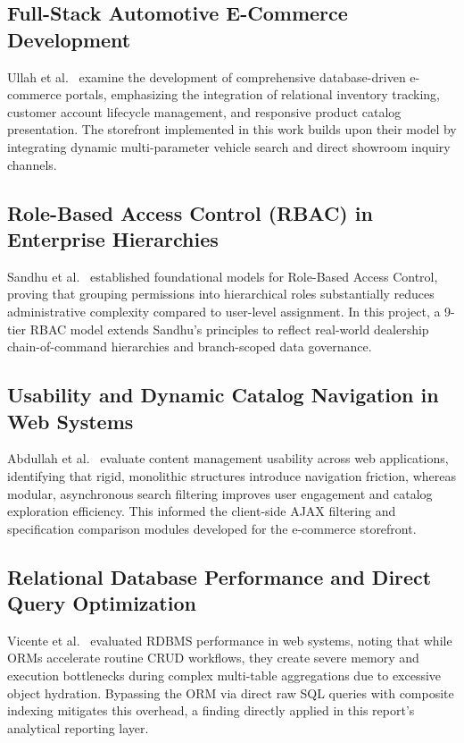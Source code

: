 \subsection{Full-Stack Automotive E-Commerce Development}
Ullah et al.~\cite{ullah2016developing} examine the development of comprehensive database-driven e-commerce portals, emphasizing the integration of relational inventory tracking, customer account lifecycle management, and responsive product catalog presentation. The storefront implemented in this work builds upon their model by integrating dynamic multi-parameter vehicle search and direct showroom inquiry channels.

\subsection{Role-Based Access Control (RBAC) in Enterprise Hierarchies}
Sandhu et al.~\cite{sandhu1996role} established foundational models for Role-Based Access Control, proving that grouping permissions into hierarchical roles substantially reduces administrative complexity compared to user-level assignment. In this project, a 9-tier RBAC model extends Sandhu's principles to reflect real-world dealership chain-of-command hierarchies and branch-scoped data governance.

\subsection{Usability and Dynamic Catalog Navigation in Web Systems}
Abdullah et al.~\cite{abdullah2021evaluating} evaluate content management usability across web applications, identifying that rigid, monolithic structures introduce navigation friction, whereas modular, asynchronous search filtering improves user engagement and catalog exploration efficiency. This informed the client-side AJAX filtering and specification comparison modules developed for the e-commerce storefront.

\subsection{Relational Database Performance and Direct Query Optimization}
Vicente et al.~\cite{vicente2021rdbms} evaluated RDBMS performance in web systems, noting that while ORMs accelerate routine CRUD workflows, they create severe memory and execution bottlenecks during complex multi-table aggregations due to excessive object hydration. Bypassing the ORM via direct raw SQL queries with composite indexing mitigates this overhead, a finding directly applied in this report's analytical reporting layer.

